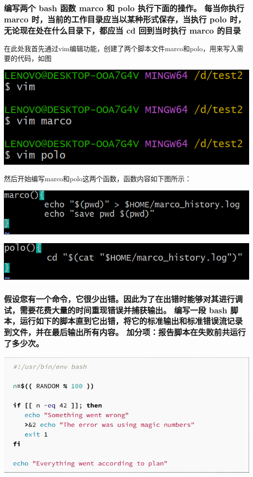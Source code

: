 \documentclass[UTF8,a4paper]{ctexart}
\begin{document}
\begin{sloppypar}
	\subsubsection{编写两个 bash 函数 marco 和 polo 执行下面的操作。 每当你执行 marco 时，当前的工作目录应当以某种形式保存，当执行 polo 时，无论现在处在什么目录下，都应当 cd 回到当时执行 marco 的目录}
	在此处我首先通过vim编辑功能，创建了两个脚本文件marco和polo，用来写入需要的代码，如图
	

	\includegraphics[width = 16cm]{6}

	然后开始编写marco和polo这两个函数，函数内容如下图所示：

	\includegraphics[width = 16cm]{7}

	\includegraphics[width = 16cm]{8}
	
	\subsubsection{假设您有一个命令，它很少出错。因此为了在出错时能够对其进行调试，需要花费大量的时间重现错误并捕获输出。 编写一段 bash 脚本，运行如下的脚本直到它出错，将它的标准输出和标准错误流记录到文件，并在最后输出所有内容。 加分项：报告脚本在失败前共运行了多少次。}

	\includegraphics[width = 16cm]{9}
	

\end{sloppypar}
\end{document}
